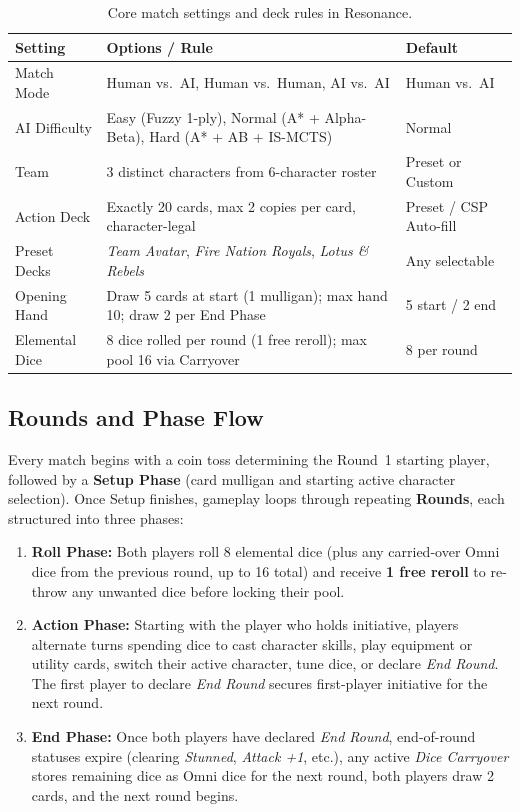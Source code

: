 \documentclass[11pt,a4paper]{article}
\begin{document}
\begin{table}[H]
\centering
\caption{Core match settings and deck rules in Resonance.}
\label{tab:match-settings}
\small
\begin{tabularx}{\textwidth}{@{}L{2.7cm} Y L{3.1cm}@{}}
\toprule
Setting & Options / Rule & Default \\
\midrule
Match Mode & Human vs.\ AI, Human vs.\ Human, AI vs.\ AI & Human vs.\ AI \\
AI Difficulty & Easy (Fuzzy 1-ply), Normal (A* + Alpha-Beta), Hard (A* + AB + IS-MCTS) & Normal \\
Team & 3 distinct characters from 6-character roster & Preset or Custom \\
Action Deck & Exactly 20 cards, max 2 copies per card, character-legal & Preset / CSP Auto-fill \\
Preset Decks & \emph{Team Avatar}, \emph{Fire Nation Royals}, \emph{Lotus \& Rebels} & Any selectable \\
Opening Hand & Draw 5 cards at start (1 mulligan); max hand 10; draw 2 per End Phase & 5 start / 2 end \\
Elemental Dice & 8 dice rolled per round (1 free reroll); max pool 16 via Carryover & 8 per round \\
\bottomrule
\end{tabularx}
\end{table}

\subsection{Rounds and Phase Flow}

Every match begins with a coin toss determining the Round~1 starting player, followed by a \textbf{Setup Phase} (card mulligan and starting active character selection). Once Setup finishes, gameplay loops through repeating \textbf{Rounds}, each structured into three phases:
\begin{enumerate}[leftmargin=1.4em, itemsep=2pt]
  \item \textbf{Roll Phase:} Both players roll 8 elemental dice (plus any carried-over Omni dice from the previous round, up to 16 total) and receive \textbf{1 free reroll} to re-throw any unwanted dice before locking their pool.
  \item \textbf{Action Phase:} Starting with the player who holds initiative, players alternate turns spending dice to cast character skills, play equipment or utility cards, switch their active character, tune dice, or declare \emph{End Round}. The first player to declare \emph{End Round} secures first-player initiative for the next round.
  \item \textbf{End Phase:} Once both players have declared \emph{End Round}, end-of-round statuses expire (clearing \emph{Stunned}, \emph{Attack +1}, etc.), any active \emph{Dice Carryover} stores remaining dice as Omni dice for the next round, both players draw 2 cards, and the next round begins.
\end{enumerate}
\end{document}
